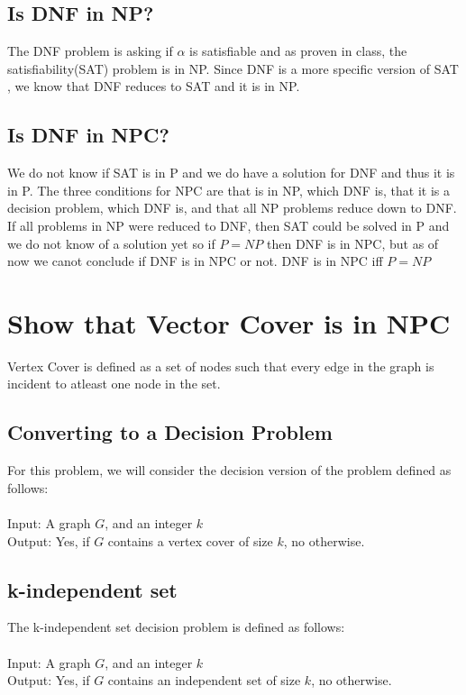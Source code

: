 \documentclass[12pt,twocolumn]{article}
\begin{document}
\subsection{ Is DNF in NP? }
The DNF problem is asking if $\alpha$ is satisfiable and as proven in class, the satisfiability(SAT) problem is in NP. Since DNF is a more specific version of SAT , we know that DNF reduces to SAT and it is in NP.

\subsection{ Is DNF in NPC? }
We do not know if SAT is in P and we do have a solution for DNF and thus it is in P. The three conditions for NPC are that is in NP, which DNF is, that it is a decision problem, which DNF is, and that all NP problems reduce down to DNF. If all problems in NP were reduced to DNF, then SAT could be solved in P and we do not know of a solution yet so if $P = NP$ then DNF is in NPC, but as of now we canot conclude if DNF is in NPC or not.
DNF is in NPC iff $P = NP$ 

\section{ Show that Vector Cover is in NPC }
Vertex Cover is defined as a set of nodes such that every edge in the graph is incident to atleast one node in the set. 
\subsection{Converting to a Decision Problem}
For this problem, we will consider the decision version of the problem defined as follows:\\
\\
Input: A graph $G$, and an integer $k$\\
Output: Yes, if $G$ contains a vertex cover of size $k$, no otherwise.\\

\subsection{k-independent set}
The k-independent set decision problem is defined as follows:\\
\\
Input: A graph $G$, and an integer $k$\\
Output: Yes, if $G$ contains an independent set of size $k$, no otherwise.\\
\\
\end{document}
